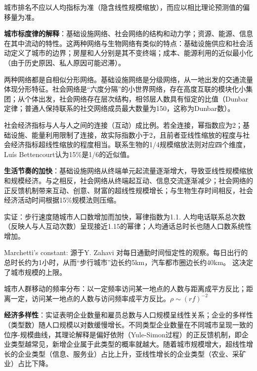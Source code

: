 \par 城市排名不应以人均指标为准（隐含线性规模缩放），而应以相比理论预测值的偏移量为准。

\par \textbf{城市标度律的解释}：基础设施网络、社会网络的结构和动力学；资源、能源、信息在其中流动的特性。这两种网络与生物网络有类似的特点：基础设施供应和社会活动定义了城市的边界；房屋和人分别是其不变终端；成本、能源利用的近似最小化（由于历史原因、私人原因可能迟滞）。

\par 两种网络都是自相似分形网络。基础设施网络是分级网络，从一地出发的交通流量体现分形特征。社会网络是“六度分隔”的小世界网络，存在高度互联的模块化小集团；从个体出发，社会网络存在层次结构，相邻层人数具有恒定的比值（Dunbar定律；普通人保持联系的社交网络成员最大数量为150，这称为Dunbar数）。

\par 社会经济指标与人与人之间的连接（互动）成比例。若全连接，幂指数应为2；基础设施、能量利用限制了连接，故实际指数小于2，且前者亚线性缩放的程度与社会经济指标超线性缩放的程度相当。联系生物的1/4规模缩放法则对应四个维度，Luís Bettencourt认为15\%是1/6的近似值。

\par \textbf{生活节奏的加快}：基础设施网络从终端单元起流量逐渐增大，导致亚线性规模缩放和规模经济。与之相反，社会网络从终端起互动、信息交流逐渐减少；社会网络的正反馈机制带来互动、创意、财富的超线性规模增长；与生物生存时间相反，社会经济活动时间根据15\%规模法则压缩。

\par 实证：步行速度随城市人口数增加而加快，幂律指数为1.1. 人均电话联系总次数（反映人与人互动次数）呈现接近1.15的幂律；人均通话总时长也随人口数系统性增加。

\par Marchetti's constant: 源于Y. Zahavi 对每日通勤时间恒定性的观察。每日出行的总时长约为1小时，从而“步行城市”边长约5km，汽车都市圈边长约40km。 这决定了城市规模的上限。

\par 城市人群移动的频率分布：以一定频率访问某一地点的人数与距离成平方反比；距离一定，访问某一地点的人数与访问频率成平方反比。$\rho \sim (rf)^{-2}$

\par \textbf{经济多样性}：实证表明企业数量和雇员总数与人口规模呈线性关系；企业的多样性（类型数）随人口规模以对数缓慢增长。不同类型企业数量在不同城市呈现一致的位序-规模曲线，其理论解释是偏好依附（Yule-Simon过程）的正反馈机制，即企业类型越常见，新增企业属于此类型的概率就越大。随着城市规模增大，超线性增长的企业类型（信息、服务业）占比上升，亚线性增长的企业类型（农业、采矿业）占比下降。

